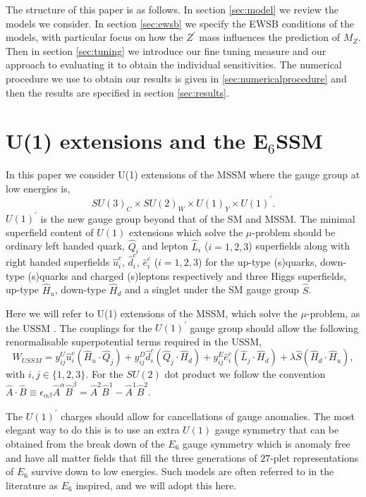 \documentclass[preprint,amsmath,amssymb,aps,superscriptaddress,prd,showpacs,floatfix,nofootinbib]{revtex4-1}
\newcommand{\be}{\begin{equation}}
\newcommand{\ee}{\end{equation}}
\begin{document}
The structure of this paper is as follows.  In section \ref{sec:model}
we review the models we consider.  In section \ref{sec:ewsb} we
specify the EWSB conditions of the models, with particular focus on
how the $Z^\prime$ mass influences the prediction of $M_Z$.  Then in
section \ref{sec:tuning} we introduce our fine tuning measure and our
approach to evaluating it to obtain the individual sensitivities.  The
numerical procedure we use to obtain our results is given in
\ref{sec:numericalprocedure} and then the results are specified in
section \ref{sec:results}.

\section{\label{sec:model}U(1) extensions and the E$_6$SSM}
In this paper we consider U(1) extensions of the MSSM where the gauge
group at low energies is, \be SU(3)_C\times SU(2)_W\times U(1)_Y\times
U(1)^\prime. \ee $U(1)^\prime$ is the new gauge group beyond
that of the SM and MSSM. The minimal superfield content of $U(1)$
extensions which solve the $\mu$-problem should be ordinary left
handed quark, $\hat{Q}_i$ and lepton $\hat{L}_i$
($i=1,2,3$) superfields along with right handed superfields
$\hat{u}^c_i$, $\hat{d}^c_i$, $\hat{e}^c_i$ ($i=1,2,3$) for the
up-type (s)quarks, down-type (s)quarks and charged (s)leptons
respectively and three Higgs superfields, up-type $\hat{H}_u$,
down-type $\hat{H}_d$ and a singlet under the SM gauge group
$\hat{S}$.


Here we will refer to U(1) extensions of the MSSM, which solve the
$\mu$-problem, as the USSM \cite{Cvetic:1995rj, Jain:1995cb,
  Nir:1995bu, Cvetic:1996mf, Cvetic:1997ky}.  The couplings for the
$U(1)^\prime$ gauge group should allow the following renormalisable
superpotential terms required in the USSM, \be W_{USSM} = y^U_{ij}
\hat{u}^c_i \left ( \hat{H}_u \cdot \hat{Q}_j \right ) + y^D_{ij} \hat{d}^c_i 
\left ( \hat{Q}_j \cdot \hat{H}_d \right )
 + y^E_{ij} \hat{e}^c_i \left ( \hat{L}_j \cdot \hat{H}_d \right ) + \lambda \hat{S}
\left ( \hat{H}_d \cdot \hat{H}_u \right ), \ee with $i,j \in \{1,2,3\}$. 
For the $SU(2)$ dot product we follow the convention $\hat{A}\cdot \hat{B}\equiv \epsilon_{\alpha\beta}\hat{A}^\alpha\hat{B}^\beta=\hat{A}^2\hat{B}^1-\hat{A}^1\hat{B}^2$.


The $U(1)^\prime$ charges should allow for cancellations of gauge
anomalies.  The most elegant way to do this is to use an extra $U(1)$
gauge symmetry that can be obtained from the break down of the $E_6$
gauge symmetry which is anomaly free and have all matter fields that fill the
three generations of $27$-plet representations of $E_6$ survive down to
low energies.  Such models are often referred to in the literature as
$E_6$ inspired, and we will adopt this here.
\end{document}
